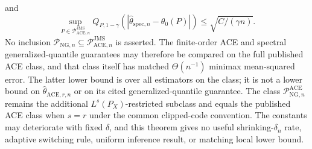 and
\[
 \sup_{P\in\mathcal P_{\mathrm{ACE},n}^{\mathrm{JMS}}}
 Q_{P,1-\gamma}(|\widehat\theta_{\mathrm{spec},n}-\theta_0(P)|)
 \le\sqrt{C/(\gamma n)}.
\]
No inclusion \(\mathcal P_{\mathrm{NG},n}\subseteq\mathcal P_{\mathrm{ACE},n}^{\mathrm{JMS}}\) is asserted. The finite-order ACE and spectral generalized-quantile guarantees may therefore be compared on the full published ACE class, and that class itself has matched \(\Theta(n^{-1})\) minimax mean-squared error. The latter lower bound is over all estimators on the class; it is not a lower bound on \(\widehat\theta_{\mathrm{ACE},r,n}\) or on its cited generalized-quantile guarantee. The class \(\mathcal P_{\mathrm{NG},n}^{\mathrm{ACE}}\) remains the additional \(L^s(P_X)\)-restricted subclass and equals the published ACE class when \(s=r\) under the common clipped-code convention. The constants may deteriorate with fixed \(\delta\), and this theorem gives no useful shrinking-\(\delta_n\) rate, adaptive switching rule, uniform inference result, or matching local lower bound.